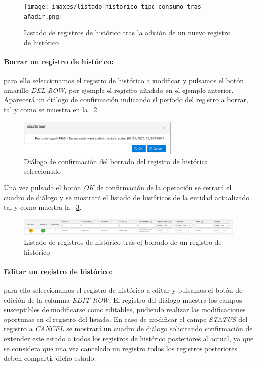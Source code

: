 \begin{figure}
  \centering
  \texttt{[image: imaxes/listado-historico-tipo-consumo-tras-añadir.png]}
  \caption{Listado de registros de histórico tras la adición de un nuevo registro de histórico}
  \label{fig:listado-historico-tipo-consumo-tras-añadir}
\end{figure}


\paragraph{Borrar un registro de histórico:} para ello seleccionamos el registro de histórico a modificar y pulsamos el botón amarillo \emph{DEL ROW}, por ejemplo el registro añadido en el ejemplo anterior. Aparecerá un diálogo de confirmación indicando el período del registro a borrar, tal y como se muestra en la \figurename~\ref{fig:borrado-historico-tipo-cuota}.


\begin{figure}
  \centering
  \includegraphics[width=0.70\textwidth]{imaxes/borrado-historico-tipo-cuota.png}
  \caption{Diálogo de confirmación del borrado del registro de histórico seleccionado}
  \label{fig:borrado-historico-tipo-cuota}
\end{figure}


Una vez pulsado el botón  \emph{OK}  de confirmación de la operación se cerrará el cuadro de diálogo y se mostrará el listado de históricos de la entidad actualizado tal y como muestra la \figurename~\ref{fig:listado-historico-tipo-consumo-tras-borrar}.


\begin{figure}
  \centering
  \includegraphics[width=\textwidth]{imaxes/listado-historico-tipo-consumo-tras-borrar.png}
  \caption{Listado de registros de histórico tras el borrado de un registro de histórico}
  \label{fig:listado-historico-tipo-consumo-tras-borrar}
\end{figure}




\paragraph{Editar un registro de histórico:} para ello seleccionamos el registro de histórico a editar y pulsamos el botón de edición de la columna \emph{EDIT ROW}. El registro del diálogo muestra los campos susceptibles de modificarse como editables, pudiendo realizar las modificaciones oportunas en el registro del listado. En caso de modificar el campo \emph{STATUS} del registro a \emph{CANCEL} se mostrará un cuadro de diálogo solicitando confirmación de extender este estado a todos los registros de histórico posteriores al actual, ya que se considera que una vez cancelado un registro todos los registros posteriores deben compartir dicho estado.

